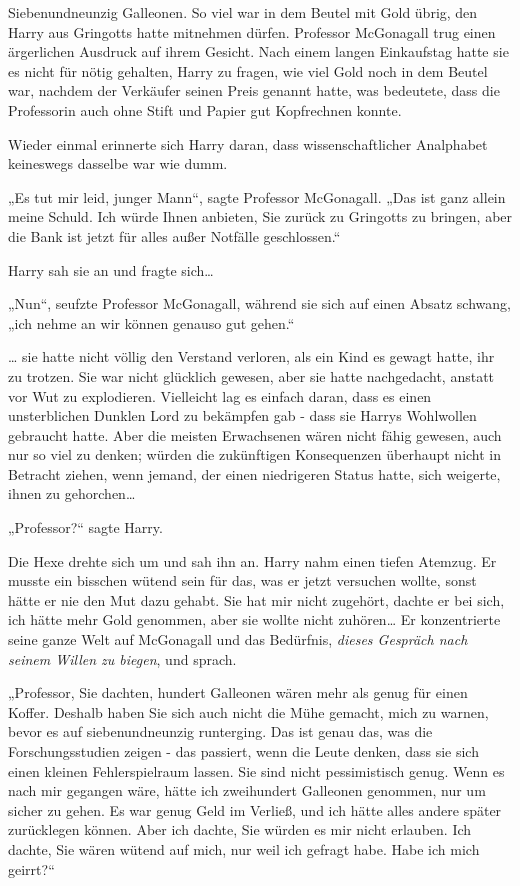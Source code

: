 {Siebenundneunzig Galleonen. So viel war in dem Beutel mit Gold übrig, den Harry aus Gringotts hatte mitnehmen dürfen. Professor McGonagall trug einen ärgerlichen Ausdruck auf ihrem Gesicht. Nach einem langen Einkaufstag hatte sie es nicht für nötig gehalten, Harry zu fragen, wie viel Gold noch in dem Beutel war, nachdem der Verkäufer seinen Preis genannt hatte, was bedeutete, dass die Professorin auch ohne Stift und Papier gut Kopfrechnen konnte.

Wieder einmal erinnerte sich Harry daran, dass wissenschaftlicher Analphabet keineswegs dasselbe war wie dumm.

„Es tut mir leid, junger Mann“, sagte Professor McGonagall. „Das ist ganz allein meine Schuld. Ich würde Ihnen anbieten, Sie zurück zu Gringotts zu bringen, aber die Bank ist jetzt für alles außer Notfälle geschlossen.“

Harry sah sie an und fragte sich…

„Nun“, seufzte Professor McGonagall, während sie sich auf einen Absatz schwang, „ich nehme an wir können genauso gut gehen.“

… sie hatte nicht völlig den Verstand verloren, als ein Kind es gewagt hatte, ihr zu trotzen. Sie war nicht glücklich gewesen, aber sie hatte nachgedacht, anstatt vor Wut zu explodieren. Vielleicht lag es einfach daran, dass es einen unsterblichen Dunklen Lord zu bekämpfen gab - dass sie Harrys Wohlwollen gebraucht hatte. Aber die meisten Erwachsenen wären nicht fähig gewesen, auch nur so viel zu denken; würden die zukünftigen Konsequenzen überhaupt nicht in Betracht ziehen, wenn jemand, der einen niedrigeren Status hatte, sich weigerte, ihnen zu gehorchen…

„Professor?“ sagte Harry.

Die Hexe drehte sich um und sah ihn an. Harry nahm einen tiefen Atemzug. Er musste ein bisschen wütend sein für das, was er jetzt versuchen wollte, sonst hätte er nie den Mut dazu gehabt. Sie hat mir nicht zugehört, dachte er bei sich, ich hätte mehr Gold genommen, aber sie wollte nicht zuhören… Er konzentrierte seine ganze Welt auf McGonagall und das Bedürfnis, \emph{dieses Gespräch nach seinem Willen zu biegen}, und sprach.

„Professor, Sie dachten, hundert Galleonen wären mehr als genug für einen Koffer. Deshalb haben Sie sich auch nicht die Mühe gemacht, mich zu warnen, bevor es auf siebenundneunzig runterging. Das ist genau das, was die Forschungsstudien zeigen - das passiert, wenn die Leute denken, dass sie sich einen kleinen Fehlerspielraum lassen. Sie sind nicht pessimistisch genug. Wenn es nach mir gegangen wäre, hätte ich zweihundert Galleonen genommen, nur um sicher zu gehen. Es war genug Geld im Verließ, und ich hätte alles andere später zurücklegen können. Aber ich dachte, Sie würden es mir nicht erlauben. Ich dachte, Sie wären wütend auf mich, nur weil ich gefragt habe. Habe ich mich geirrt?“

}
